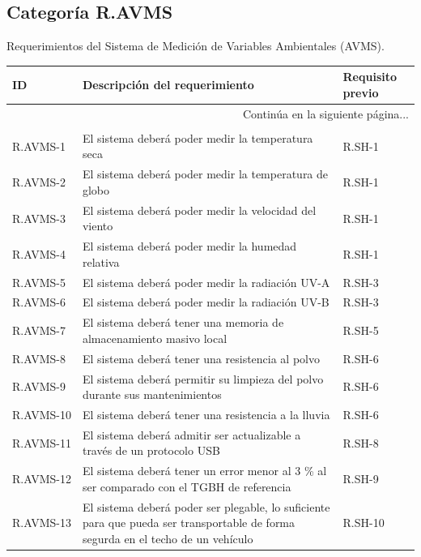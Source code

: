 \documentclass{article}%
\begin{document}
%
\newpage%
\subsection{Categoría R.AVMS}%
\label{subsec:CategoraR.AVMS}%
Requerimientos del Sistema de Medición de Variables Ambientales (AVMS).\newline%
\newline%
%
\begin{longtable}{|p{2cm}|p{9cm}|p{2.7cm}|}%
\hline%
ID&Descripción del requerimiento&Requisito previo\\%
\hline%
\endhead%
\hline%
\multicolumn{3}{|r|}{Continúa en la siguiente página...}\\%
\hline%
\endfoot%
\hline%
\multicolumn{3}{|r|}{Fin de la tabla}\\%
\hline%
\endlastfoot%
R.AVMS{-}1& El sistema deberá poder medir la temperatura seca& R.SH{-}1\\%
\hline%
R.AVMS{-}2& El sistema deberá poder medir la temperatura de globo& R.SH{-}1\\%
\hline%
R.AVMS{-}3& El sistema deberá poder medir la velocidad del viento& R.SH{-}1\\%
\hline%
R.AVMS{-}4& El sistema deberá poder medir la humedad relativa& R.SH{-}1\\%
\hline%
R.AVMS{-}5& El sistema deberá poder medir la radiación UV{-}A& R.SH{-}3\\%
\hline%
R.AVMS{-}6& El sistema deberá poder medir la radiación UV{-}B& R.SH{-}3\\%
\hline%
R.AVMS{-}7& El sistema deberá tener una memoria de almacenamiento masivo local& R.SH{-}5\\%
\hline%
R.AVMS{-}8& El sistema deberá tener una resistencia al polvo&R.SH{-}6\\%
\hline%
R.AVMS{-}9& El sistema deberá permitir su limpieza del polvo durante sus mantenimientos&R.SH{-}6\\%
\hline%
R.AVMS{-}10& El sistema deberá tener una resistencia a la lluvia&R.SH{-}6\\%
\hline%
R.AVMS{-}11& El sistema deberá admitir ser actualizable a través de un protocolo USB&R.SH{-}8\\%
\hline%
R.AVMS{-}12& El sistema deberá tener un error menor al 3 \% al ser comparado con el TGBH de referencia&R.SH{-}9\\%
\hline%
R.AVMS{-}13& El sistema deberá poder ser plegable, lo suficiente para que pueda ser transportable de forma segurda en el techo de un vehículo&R.SH{-}10\\%

\end{longtable}
\end{document}
